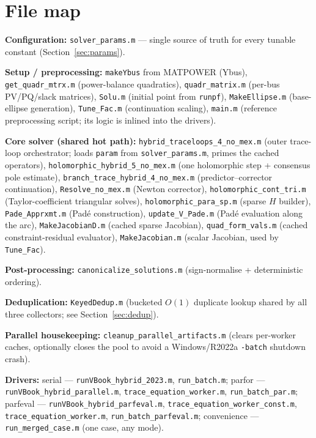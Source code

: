 \documentclass[11pt,a4paper]{article}
\newcommand{\code}[1]{\texttt{#1}}
\begin{document}
\section{File map}

\textbf{Configuration:} \code{solver_params.m} --- single source of truth for every
tunable constant (Section~\ref{sec:params}).

\textbf{Setup / preprocessing:}
\code{makeYbus} from MATPOWER (Ybus), \code{get_quadr_mtrx.m} (power-balance quadratics),
\code{quadr_matrix.m} (per-bus PV/PQ/slack matrices), \code{Solu.m} (initial point from
\code{runpf}), \code{MakeEllipse.m} (base-ellipse generation), \code{Tune_Fac.m}
(continuation scaling), \code{main.m} (reference preprocessing script; its logic is
inlined into the drivers).

\textbf{Core solver (shared hot path):}
\code{hybrid_traceloops_4_no_mex.m} (outer trace-loop orchestrator; loads \code{param}
from \code{solver_params.m}, primes the cached operators), \code{holomorphic_hybrid_5_no_mex.m} (one
holomorphic step + consensus pole estimate), \code{branch_trace_hybrid_4_no_mex.m}
(predictor--corrector continuation), \code{Resolve_no_mex.m} (Newton corrector),
\code{holomorphic_cont_tri.m} (Taylor-coefficient triangular solves),
\code{holomorphic_para_sp.m} (sparse $H$ builder), \code{Pade_Apprxmt.m} (Pad\'e
construction), \code{update_V_Pade.m} (Pad\'e evaluation along the arc),
\code{MakeJacobianD.m} (cached sparse Jacobian), \code{quad_form_vals.m} (cached
constraint-residual evaluator), \code{MakeJacobian.m} (scalar Jacobian, used by
\code{Tune_Fac}).

\textbf{Post-processing:} \code{canonicalize_solutions.m} (sign-normalise + deterministic
ordering).

\textbf{Deduplication:} \code{KeyedDedup.m} (bucketed $O(1)$ duplicate lookup shared by all
three collectors; see Section~\ref{sec:dedup}).

\textbf{Parallel housekeeping:} \code{cleanup_parallel_artifacts.m} (clears per-worker
caches, optionally closes the pool to avoid a Windows/R2022a \code{-batch} shutdown
crash).

\textbf{Drivers:}
serial --- \code{runVBook_hybrid_2023.m}, \code{run_batch.m};
parfor --- \code{runVBook_hybrid_parallel.m}, \code{trace_equation_worker.m},
\code{run_batch_par.m};
parfeval --- \code{runVBook_hybrid_parfeval.m}, \code{trace_equation_worker_const.m},
\code{trace_equation_worker.m}, \code{run_batch_parfeval.m};
convenience --- \code{run_merged_case.m} (one case, any mode).
\end{document}
